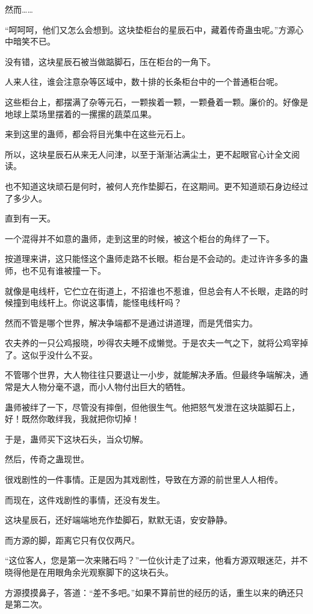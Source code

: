 \begin{this_body}
然而……

“呵呵呵，他们又怎么会想到。这块垫柜台的星辰石中，藏着传奇蛊虫呢。”方源心中暗笑不已。

没有错，这块星辰石被当做踮脚石，压在柜台的一角下。

人来人往，谁会注意杂等区域中，数十排的长条柜台中的一个普通柜台呢。

这些柜台上，都摆满了杂等元石，一颗挨着一颗，一颗叠着一颗。廉价的。好像是地球上菜场里摆着的一摞摞的蔬菜瓜果。

来到这里的蛊师，都会将目光集中在这些元石上。

所以，这块星辰石从来无人问津，以至于渐渐沾满尘土，更不起眼官心计全文阅读。

也不知道这块顽石是何时，被何人充作垫脚石，在这期间。更不知道顽石身边经过了多少人。

直到有一天。

一个混得并不如意的蛊师，走到这里的时候，被这个柜台的角绊了一下。

按道理来讲，这只能怪这个蛊师走路不长眼。柜台是不会动的。走过许许多多的蛊师，也不见有谁被撞一下。

就像是电线杆，它伫立在街道上，不招谁也不惹谁，但总会有人不长眼，走路的时候撞到电线杆上。你说这事情，能怪电线杆吗？

然而不管是哪个世界，解决争端都不是通过讲道理，而是凭借实力。

农夫养的一只公鸡报晓，吵得农夫睡不成懒觉。于是农夫一气之下，就将公鸡宰掉了。这似乎没什么不妥。

不管哪个世界，大人物往往只要退让一小步，就能解决矛盾。但最终争端解决，通常是大人物分毫不退，而小人物付出巨大的牺牲。

蛊师被绊了一下，尽管没有摔倒，但他很生气。他把怒气发泄在这块踮脚石上，好！既然你敢绊我，我就把你切掉！

于是，蛊师买下这块石头，当众切解。

然后，传奇之蛊现世。

很戏剧性的一件事情。正是因为其戏剧性，导致在方源的前世里人人相传。

而现在，这件戏剧性的事情，还没有发生。

这块星辰石，还好端端地充作垫脚石，默默无语，安安静静。

而方源的脚，距离它只有仅仅两尺。

“这位客人，您是第一次来赌石吗？”一位伙计走了过来，他看方源双眼迷茫，并不晓得他是在用眼角余光观察脚下的这块石头。

方源摸摸鼻子，答道：“差不多吧。”如果不算前世的经历的话，重生以来的确还只是第二次。


\end{this_body}

